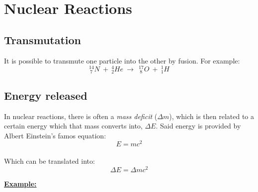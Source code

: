 \documentclass[12pt]{article}
\begin{document}
\newpage

\section{Nuclear Reactions}
\subsection{Transmutation}
It is possible to transmute one particle into the other by fusion. For example: $$^{14}_{\ 7}N \ + \ ^{4}_{2}He \ \rightarrow \ \ ^{17}_{\ 8}O \ + \ ^{1}_{1}H$$


\subsection{Energy released}

In nuclear reactions, there is often a \emph{mass deficit} ($\Delta m$), which is then related to a certain energy which that mass converts into, $\Delta E$. Said energy is provided by Albert Einstein's famos equation: $$E = mc^2$$ \\
Which can be translated into: $$\Delta E = \Delta mc^2$$

\begin{boxA}
	\textbf{\underline{Example:}} \bigbreak
	
\end{boxA}
\end{document}

